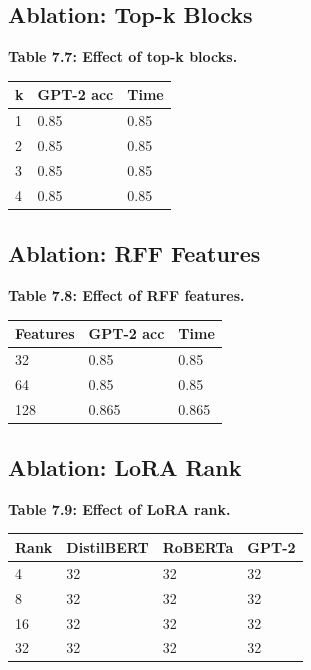 \subsection{Ablation: Top-k Blocks}

\textbf{Table 7.7: Effect of top-k blocks.}

\begin{table}[H]
\centering
\small
\begin{tabular}{lll}
\toprule
\textbf{k} & \textbf{GPT-2 acc} & \textbf{Time} \\
\midrule
1 & 0.85 & 0.85 \\
2 & 0.85 & 0.85 \\
3 & 0.85 & 0.85 \\
4 & 0.85 & 0.85 \\
\bottomrule
\end{tabular}
\end{table}

\subsection{Ablation: RFF Features}

\textbf{Table 7.8: Effect of RFF features.}

\begin{table}[H]
\centering
\small
\begin{tabular}{lll}
\toprule
\textbf{Features} & \textbf{GPT-2 acc} & \textbf{Time} \\
\midrule
32 & 0.85 & 0.85 \\
64 & 0.85 & 0.85 \\
128 & 0.865 & 0.865 \\
\bottomrule
\end{tabular}
\end{table}

\subsection{Ablation: LoRA Rank}

\textbf{Table 7.9: Effect of LoRA rank.}

\begin{table}[H]
\centering
\small
\begin{tabular}{llll}
\toprule
\textbf{Rank} & \textbf{DistilBERT} & \textbf{RoBERTa} & \textbf{GPT-2} \\
\midrule
4 & 32 & 32 & 32 \\
8 & 32 & 32 & 32 \\
16 & 32 & 32 & 32 \\
32 & 32 & 32 & 32 \\
\bottomrule
\end{tabular}
\end{table}

